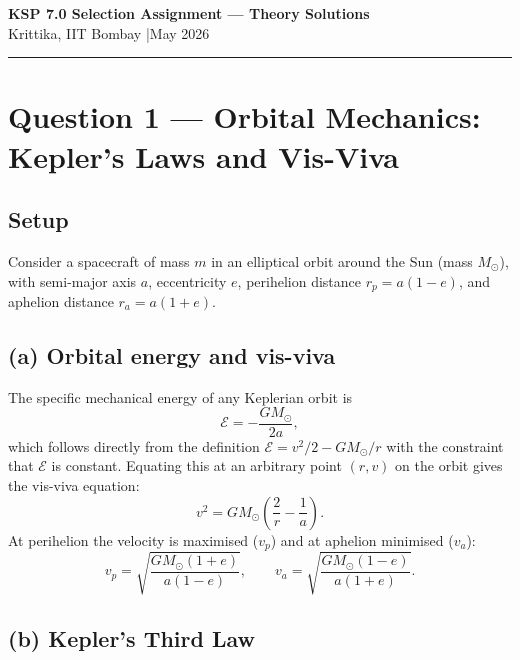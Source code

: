 \documentclass[11pt, a4paper]{article}
\begin{document}
\begin{center}
  {\Large \textbf{KSP 7.0 Selection Assignment — Theory Solutions}}\\[4pt]
  {\large Krittika, IIT Bombay \quad|\quad May 2026}
\end{center}

\vspace{4pt}
\hrule
\vspace{10pt}

\tableofcontents
\newpage

\section{Question 1 — Orbital Mechanics: Kepler's Laws and Vis-Viva}

\subsection*{Setup}

Consider a spacecraft of mass $m$ in an elliptical orbit around the Sun (mass $M_\odot$),
with semi-major axis $a$, eccentricity $e$, perihelion distance $r_p = a(1-e)$, and
aphelion distance $r_a = a(1+e)$.

\subsection*{(a) Orbital energy and vis-viva}

The specific mechanical energy of any Keplerian orbit is
\begin{equation}
  \mathcal{E} = -\frac{GM_\odot}{2a},
\end{equation}
which follows directly from the definition $\mathcal{E} = v^2/2 - GM_\odot/r$ with
the constraint that $\mathcal{E}$ is constant.  Equating this at an arbitrary point
$(r, v)$ on the orbit gives the vis-viva equation:
\begin{equation}
  \boxed{v^2 = GM_\odot\!\left(\frac{2}{r} - \frac{1}{a}\right).}
  \label{eq:visviva}
\end{equation}
At perihelion the velocity is maximised ($v_p$) and at aphelion minimised ($v_a$):
\begin{equation}
  v_p = \sqrt{\frac{GM_\odot(1+e)}{a(1-e)}}, \qquad
  v_a = \sqrt{\frac{GM_\odot(1-e)}{a(1+e)}}.
\end{equation}

\subsection*{(b) Kepler's Third Law}
\end{document}

